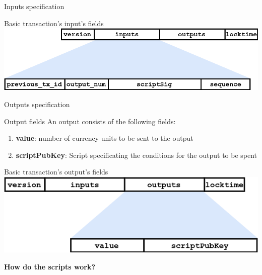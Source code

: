 \documentclass{beamer}
\begin{document}
\begin{frame}{Inputs specification}
 \begin{exampleblock}{Basic transaction's input's fields}
  \includegraphics[width=\textwidth, height=0.8\textheight, keepaspectratio]{img/tx_input.png}
 \end{exampleblock}
\end{frame}
\begin{frame}{Outputs specification}
 \begin{block}{Output fields}
  An output consists of the following fields:
  \begin{enumerate}
   \item \textbf{value}: number of currency units to be sent to the output
   \item \textbf{scriptPubKey}: Script specificating the conditions for the output to be spent
  \end{enumerate}
 \end{block}
 \begin{exampleblock}{Basic transaction's output's fields}
  \includegraphics[width=\textwidth, height=0.8\textheight, keepaspectratio]{img/tx_output.png}
 \end{exampleblock}
\end{frame}
\begin{frame}
 \begin{center}
  \textbf{How do the scripts work?}
 \end{center}
\end{frame}
\end{document}
